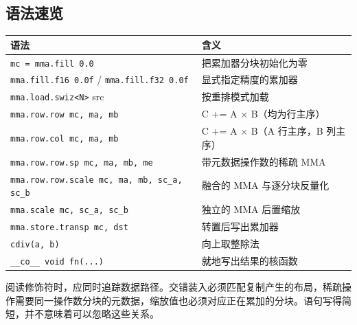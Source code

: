 \subsection*{语法速览}

\begin{table}[htbp]\centering\small
\begin{tabularx}{\linewidth}{@{}lX@{}}
\toprule
\textbf{语法} & \textbf{含义} \\
\midrule
\texttt{mc = mma.fill 0.0} & 把累加器分块初始化为零 \\
\texttt{mma.fill.f16 0.0f} / \texttt{mma.fill.f32 0.0f} & 显式指定精度的累加器 \\
\texttt{mma.load.swiz\textless{}N\textgreater{}} src & 按重排模式加载 \\
\texttt{mma.row.row mc, ma, mb} & C += A × B（均为行主序） \\
\texttt{mma.row.col mc, ma, mb} & C += A × B（A 行主序，B 列主序） \\
\texttt{mma.row.row.sp mc, ma, mb, me} & 带元数据操作数的稀疏 MMA \\
\texttt{mma.row.row.scale mc, ma, mb, sc\_a, sc\_b} & 融合的 MMA 与逐分块反量化 \\
\texttt{mma.scale mc, sc\_a, sc\_b} & 独立的 MMA 后置缩放 \\
\texttt{mma.store.transp mc, dst} & 转置后写出累加器 \\
\texttt{cdiv(a, b)} & 向上取整除法 \\
\texttt{\_\_co\_\_ void fn(...)} & 就地写出结果的核函数 \\
\bottomrule
\end{tabularx}
\end{table}

阅读修饰符时，应同时追踪数据路径。交错装入必须匹配复制产生的布局，稀疏操作需要同一操作数分块的元数据，缩放值也必须对应正在累加的分块。语句写得简短，并不意味着可以忽略这些关系。
